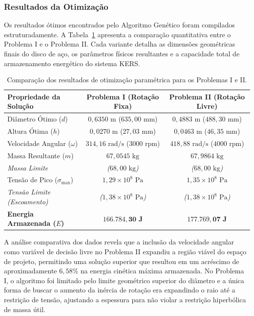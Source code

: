 \documentclass[a4paper, 12pt]{article}%
\begin{document}
\subsubsection*{Resultados da Otimização}

Os resultados ótimos encontrados pelo Algoritmo Genético foram compilados estruturadamente. A Tabela~\ref{tab:resultados_otimizacao} apresenta a comparação quantitativa entre o Problema I e o Problema II. Cada variante detalha as dimensões geométricas finais do disco de aço, os parâmetros físicos resultantes e a capacidade total de armazenamento energético do sistema KERS.

\begin{table}[H]
    \centering
    \caption{Comparação dos resultados de otimização paramétrica para os Problemas I e II.}
    \label{tab:resultados_otimizacao}
    \vspace{0.2cm}
    \begin{tabular}{lcc}
        \toprule
        \textbf{Propriedade da Solução} & \textbf{Problema I (Rotação Fixa)} & \textbf{Problema II (Rotação Livre)} \\
        \midrule
        Diâmetro Ótimo ($d$) & $0,6350\text{ m}$ ($635,00\text{ mm}$) & $0,4883\text{ m}$ ($488,30\text{ mm}$) \\
        Altura Ótima ($h$) & $0,0270\text{ m}$ ($27,03\text{ mm}$) & $0,0463\text{ m}$ ($46,35\text{ mm}$) \\
        Velocidade Angular ($\omega$) & $314,16\text{ rad/s}$ ($3000\text{ rpm}$) & $418,88\text{ rad/s}$ ($4000\text{ rpm}$) \\
        Massa Resultante ($m$) & $67,0545\text{ kg}$ & $67,9864\text{ kg}$ \\
        \textit{Massa Limite} & \textit{($68,00\text{ kg}$)} & \textit{($68,00\text{ kg}$)} \\
        Tensão de Pico ($\sigma_{\max}$) & $1,29 \times 10^8\text{ Pa}$ & $1,35 \times 10^8\text{ Pa}$ \\
        \textit{Tensão Limite (Escoamento)} & \textit{($1,38 \times 10^8\text{ Pa}$)} & \textit{($1,38 \times 10^8\text{ Pa}$)} \\
        \textbf{Energia Armazenada ($E$)} & $\mathbf{166.784,30\text{ J}}$ & $\mathbf{177.769,07\text{ J}}$ \\
        \bottomrule
    \end{tabular}
\end{table}

A análise comparativa dos dados revela que a inclusão da velocidade angular como variável de decisão livre no Problema II expandiu a região viável do espaço de projeto, permitindo uma solução superior que resultou em um acréscimo de aproximadamente $6,58\%$ na energia cinética máxima armazenada. No Problema I, o algoritmo foi limitado pelo limite geométrico superior do diâmetro e a única forma de buscar o aumento da inércia de rotação era expandindo o raio até a restrição de tensão, ajustando a espessura para não violar a restrição hiperbólica de massa útil. 
\end{document}
